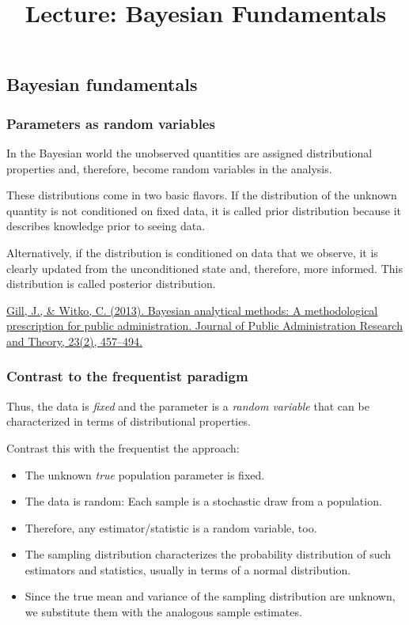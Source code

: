 \documentclass[
  11pt,
]{article}
\title{Lecture: Bayesian Fundamentals}
\author{}
\date{\vspace{-2.5em}}
\providecommand{\tightlist}{%
  \setlength{\itemsep}{0pt}\setlength{\parskip}{0pt}}
\begin{document}
\maketitle

\hypertarget{bayesian-fundamentals}{%
\subsection{Bayesian fundamentals}\label{bayesian-fundamentals}}

\hypertarget{parameters-as-random-variables}{%
\subsubsection{Parameters as random variables}\label{parameters-as-random-variables}}

In the Bayesian world the unobserved quantities are assigned
distributional properties and, therefore, become random variables in the
analysis.

These distributions come in two basic flavors. If the distribution
of the unknown quantity is not conditioned on fixed data, it is called
prior distribution because it describes knowledge prior to seeing data.

Alternatively, if the distribution is conditioned on data that we
observe, it is clearly updated from the unconditioned state and,
therefore, more informed. This distribution is called posterior
distribution.

\href{https://academic.oup.com/jpart/article/23/2/457/1003493}{Gill, J., \& Witko, C. (2013). Bayesian analytical methods: A
methodological prescription for public administration. Journal of Public
Administration Research and Theory, 23(2),
457--494.}

\hypertarget{contrast-to-the-frequentist-paradigm}{%
\subsubsection{Contrast to the frequentist paradigm}\label{contrast-to-the-frequentist-paradigm}}

Thus, the data is \emph{fixed} and the parameter is a \emph{random variable} that
can be characterized in terms of distributional properties.

Contrast this with the frequentist the approach:

\begin{itemize}
\tightlist
\item
  The unknown \emph{true} population parameter is fixed.
\item
  The data is random: Each sample is a stochastic draw from a
  population.
\item
  Therefore, any estimator/statistic is a random variable, too.
\item
  The sampling distribution characterizes the probability distribution
  of such estimators and statistics, usually in terms of a normal
  distribution.
\item
  Since the true mean and variance of the sampling
  distribution are unknown, we substitute them with the analogous
  sample estimates.
\end{itemize}
\end{document}
